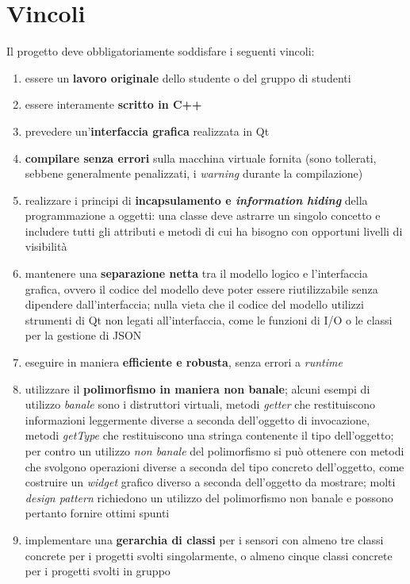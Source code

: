 \documentclass[10pt,a4paper,oneside]{article}
\begin{document}
\section{Vincoli}
Il progetto deve obbligatoriamente soddisfare i seguenti vincoli:
\begin{enumerate}
 \item essere un \textbf{lavoro originale} dello studente o del gruppo di studenti
 \item essere interamente \textbf{scritto in C++}
 \item prevedere un'\textbf{interfaccia grafica} realizzata in Qt
 \item \textbf{compilare senza errori} sulla macchina virtuale fornita (sono tollerati, sebbene generalmente penalizzati, i \emph{warning} durante la compilazione)
 \item realizzare i principi di \textbf{incapsulamento e \emph{information hiding}} della programmazione a oggetti: una classe deve astrarre un singolo concetto e includere tutti gli attributi e metodi di cui ha bisogno con opportuni livelli di visibilità
 \item mantenere una \textbf{separazione netta} tra il modello logico e l'interfaccia grafica, ovvero il codice del modello deve poter essere riutilizzabile senza dipendere dall'interfaccia; nulla vieta che il codice del modello utilizzi strumenti di Qt non legati all'interfaccia, come le funzioni di I/O o le classi per la gestione di JSON
  \item eseguire in maniera \textbf{efficiente e robusta}, senza errori a \emph{runtime}
 \item utilizzare il \textbf{polimorfismo in maniera non banale}; alcuni esempi di utilizzo \emph{banale} sono i distruttori virtuali, metodi \emph{getter} che restituiscono informazioni leggermente diverse a seconda dell'oggetto di invocazione, metodi \emph{getType} che restituiscono una stringa contenente il tipo dell'oggetto; per contro un utilizzo \emph{non banale} del polimorfismo si può ottenere con metodi che svolgono operazioni diverse a seconda del tipo concreto dell'oggetto, come costruire un \emph{widget} grafico diverso a seconda dell'oggetto da mostrare; molti \emph{design pattern} richiedono un utilizzo del polimorfismo non banale e possono pertanto fornire ottimi spunti
 \item implementare una \textbf{gerarchia di classi} per i sensori con almeno tre classi concrete per i progetti svolti singolarmente, o almeno cinque classi concrete per i progetti svolti in gruppo

\end{enumerate}
\end{document}

